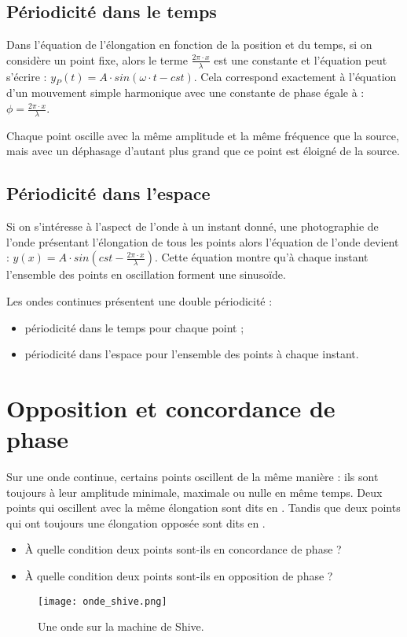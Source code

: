 \subsection{Périodicité dans le temps}
Dans l'équation de l'élongation en fonction de la position et du temps, si on considère un point fixe, alors le terme \(\frac{2 \pi \cdot x}{\lambda}\) est une constante et l'équation peut s'écrire : \(y_P (t) = A \cdot sin (\omega \cdot t- cst)\). Cela correspond exactement à l'équation d'un mouvement simple harmonique avec une constante de phase égale à : \(\phi = \frac{2 \pi \cdot x}{\lambda}\).

\begin{encadre}
    Chaque point oscille avec la même amplitude et la même fréquence que la source, mais avec un déphasage d'autant plus grand que ce point est éloigné de la source.
\end{encadre}

\subsection{Périodicité dans l'espace}
Si on s'intéresse à l'aspect de l'onde à un instant donné, une photographie de l'onde présentant l'élongation de tous les points alors l'équation de l'onde devient : \(y (x) = A \cdot sin (cst - \frac{2 \pi  \cdot x}{\lambda})\). Cette équation montre qu'à chaque instant l'ensemble des points en oscillation forment une sinusoïde.

\begin{encadre}
    Les ondes continues présentent une double périodicité :
    \begin{itemize}
        \item périodicité dans le temps pour chaque point ;
        \item périodicité dans l'espace pour l'ensemble des points à chaque instant.
    \end{itemize}
\end{encadre}

\newpage

\section{Opposition et concordance de phase}
Sur une onde continue, certains points oscillent de la même manière : ils sont toujours à leur amplitude minimale, maximale ou nulle en même temps. Deux points qui oscillent avec la même élongation sont dits en . Tandis que deux points qui ont toujours une élongation opposée sont dits en .
\begin{itemize}[label=\textbullet]
    \item À quelle condition deux points sont-ils en concordance de phase ?
    \item À quelle condition deux points sont-ils en opposition de phase ?
\end{itemize}

\begin{figure}[ht!]
    \centering
    \texttt{[image: onde\_shive.png]}
    \caption{Une onde sur la machine de Shive.}
    \label{onde_shive}
\end{figure}
